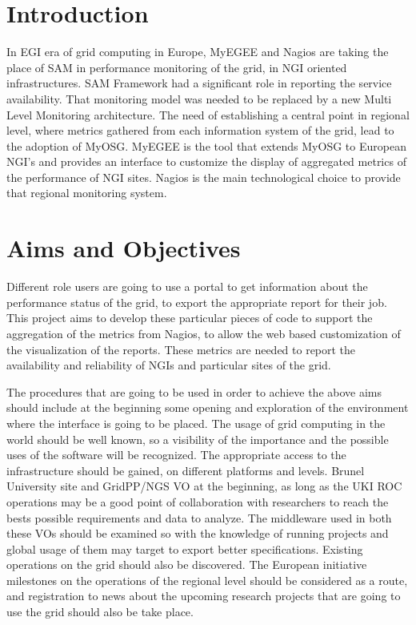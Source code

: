 \section{Introduction}

In EGI era of grid computing in Europe, MyEGEE and Nagios are taking the place of SAM in performance monitoring of the grid, in NGI oriented infrastructures. SAM Framework had a significant role in reporting the service availability. That monitoring model was needed to be replaced by a new Multi Level Monitoring architecture. The need of establishing a central point in regional level, where metrics gathered from each information system of the grid, lead to the adoption of MyOSG. MyEGEE is the tool that extends MyOSG to European NGI's and provides an interface to customize the display of aggregated metrics of the performance of NGI sites. Nagios is the main technological choice to provide that regional monitoring system.

\section{Aims and Objectives}

Different role users are going to use a portal to get information about the performance status of the grid, to export the appropriate report for their job. This project aims to develop these particular pieces of code to support the aggregation of the metrics from Nagios, to allow the web based customization of the visualization of the reports. These metrics are needed to report the availability and reliability of NGIs and particular sites of the grid.

The procedures that are going to be used in order to achieve the above aims should include at the beginning some opening and exploration of the environment where the interface is going to be placed. The usage of grid computing in the world should be well known, so a visibility of the importance and the possible uses of the software will be recognized. The appropriate access to the infrastructure should be gained, on different platforms and levels. Brunel University site and GridPP/NGS VO at the beginning, as long as the UKI ROC operations may be a good point of collaboration with researchers to reach the bests possible requirements and data to analyze. The middleware used in both these VOs should be examined so with the knowledge of running projects and global usage of them may target to export better specifications. Existing operations on the grid should also be discovered. The European initiative milestones on the operations of the regional level should be considered as a route, and registration to news about the upcoming research projects that are going to use the grid should also be take place.

